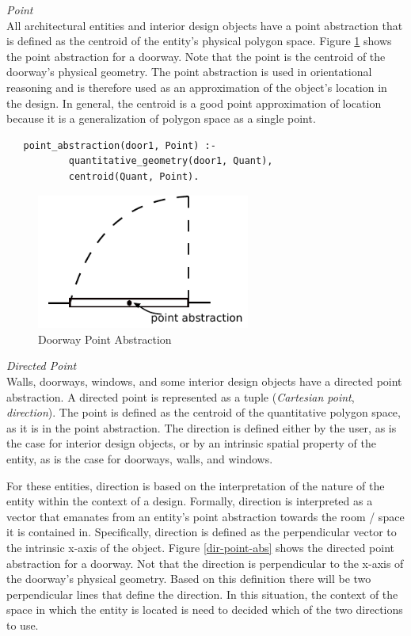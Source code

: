 \documentclass[12pt]{ucthesis}
\begin{document}
\noindent \emph{\large Point} \\
\indent All architectural entities and interior design objects have a point abstraction that is defined as the centroid of the entity's physical polygon space. Figure \ref{point-abs} shows the point abstraction for a doorway. Note that the point is the centroid of the doorway's physical geometry. The point abstraction is used in orientational reasoning and is therefore used as an approximation of the object's location in the design. In general, the centroid is a good point approximation of location because it is a generalization of polygon space as a single point. 
\begin{verbatim}
   point_abstraction(door1, Point) :-
           quantitative_geometry(door1, Quant),
           centroid(Quant, Point).
\end{verbatim}

\begin{figure}[H]
\centering
\includegraphics[width=70mm]{point-abs}
\caption{Doorway Point Abstraction}
\label{point-abs}
\end{figure}

\noindent \emph{\large Directed Point} \\
\indent Walls, doorways, windows, and some interior design objects have a directed point abstraction. A directed point is represented as a tuple (\emph{Cartesian point}, \emph{direction}). The point is defined as the centroid of the quantitative polygon space, as it is in the point abstraction. The direction is defined either by the user, as is the case for interior design objects, or by an intrinsic spatial property of the entity, as is the case for doorways, walls, and windows.

For these entities, direction is based on the interpretation of the nature of the entity within the context of a design. Formally, direction is interpreted as a vector that emanates from an entity's point abstraction towards the room / space it is contained in. Specifically, direction is defined as the perpendicular vector to the intrinsic x-axis of the object. Figure \ref{dir-point-abs} shows the directed point abstraction for a doorway. Not that the direction is perpendicular to the x-axis of the doorway's physical geometry. Based on this definition there will be two perpendicular lines that define the direction. In this situation, the context of the space in which the entity is located is need to decided which of the two directions to use.  
\end{document}

